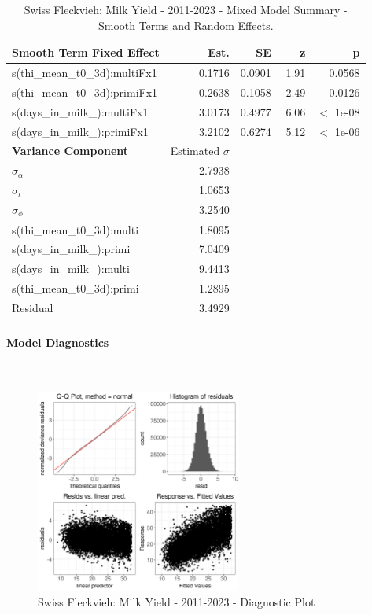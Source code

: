 \newpage
\begin{table}[H]
\centering
\begin{tabular}
{l | r | r | r | r}
\textbf{Smooth Term Fixed Effect} & Est. & SE & z & p\\
\hline
\hline
s(thi\_mean\_t0\_3d):multiFx1 & 0.1716 & 0.0901 & 1.91 & 0.0568\\
s(thi\_mean\_t0\_3d):primiFx1 & -0.2638 & 0.1058 & -2.49 & 0.0126\\
s(days\_in\_milk\_):multiFx1 & 3.0173 & 0.4977 & 6.06 & $<$ 1e-08\\
s(days\_in\_milk\_):primiFx1 & 3.2102 & 0.6274 & 5.12 & $<$ 1e-06\\
\hline
\textbf{Variance Component} & Estimated $\sigma$ & & & \\
\hline
\hline
$\sigma_\alpha$ & 2.7938 & & & \\
$\sigma_\iota$ & 1.0653 & & & \\
$\sigma_\phi$ & 3.2540 & & & \\
s(thi\_mean\_t0\_3d):multi &  1.8095 & & & \\
s(days\_in\_milk\_):primi & 7.0409 & & & \\
s(days\_in\_milk\_):multi & 9.4413 & & & \\
s(thi\_mean\_t0\_3d):primi & 1.2895 & & & \\
Residual & 3.4929 & & & \\
\end{tabular}
\caption[]{Swiss Fleckvieh: Milk Yield - 2011-2023 - Mixed Model Summary - Smooth Terms and Random Effects.}
\end{table}



\paragraph{Model Diagnostics} \quad \\
\begin{figure}[H]
    \centering
    \includegraphics[width=0.6\textwidth]{thesis/figures/models/milk/after2010/sf_milk_after2010/sf_milk_after2010_diagnostics.png}
    \caption[]{Swiss Fleckvieh: Milk Yield - 2011-2023 - Diagnostic Plot}
\end{figure}


